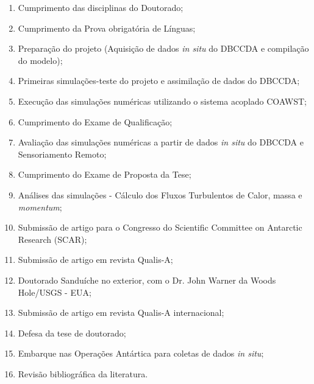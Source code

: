 \documentclass{article}
\begin{document}
\begin{enumerate}
	\item \label{a} Cumprimento das disciplinas do Doutorado;	
	\item \label{b} Cumprimento da Prova obrigatória de Línguas;
	\item \label{c} Preparação do projeto (Aquisição de dados \textit{in situ} do DBCCDA e compilação do modelo);
	\item \label{d} Primeiras simulações-teste do projeto e assimilação de dados do DBCCDA;
	\item \label{e} Execução das simulações numéricas utilizando o sistema acoplado COAWST;
	\item \label{f} Cumprimento do Exame de Qualificação;
	\item \label{g} Avaliação das simulações numéricas a partir de dados \textit{in situ} do DBCCDA e Sensoriamento Remoto;
	\item \label{h} Cumprimento do Exame de Proposta da Tese;
	\item \label{i} Análises das simulações - Cálculo dos Fluxos Turbulentos de Calor, massa e \textit{momentum};
	\item \label{j} Submissão de artigo para o Congresso do Scientific Committee on Antarctic Research (SCAR);
	\item \label{k} Submissão de artigo em revista Qualis-A;
	\item \label{l} Doutorado Sanduíche no exterior, com o Dr. John Warner da Woods Hole/USGS - EUA;
	\item \label{m} Submissão de artigo em revista Qualis-A internacional;
	\item \label{n} Defesa da tese de doutorado;
	\item \label{o} Embarque nas Operações Antártica para coletas de dados \textit{in situ};
	\item \label{p} Revisão bibliográfica da literatura.
\end{enumerate}
\end{document}
